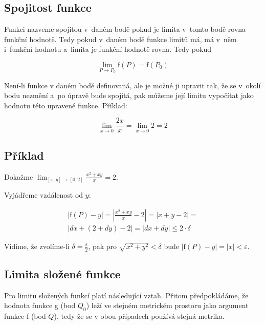 \subsection{Spojitost funkce}
\label{sec:spojitost_funkce}

Funkci nazveme spojitou v~daném bodě pokud je limita v~tomto bodě rovna funkční hodnotě. Tedy pokud v~daném bodě funkce limitů má, má v~něm i~funkční hodnotu a~limita je funkční hodnotě rovna. Tedy pokud

\begin{equation}
\lim_{P \to P_0} \mathrm{f}(P) = \mathrm{f}(P_0)
\end{equation}

Není-li funkce v daném bodě definovaná, ale je možné ji upravit tak, že se v~okolí bodu nezmění a~po úpravě bude spojitá, pak můžeme její limitu vypočítat jako hodnotu této upravené funkce. Příklad:

\begin{equation}
\lim_{x \to 0} \frac{2x}{x} = \lim_{x \to 0} 2 = 2
\end{equation}

\subsection{Příklad}

Dokažme \(\lim_{[x, y] \to [0, 2]} \frac{x^2 + x y}{x} = 2\).

Vyjádřeme vzdálenost od \(y\):

\begin{equation}
\begin{split}
|\mathrm{f}(P) - y| = \left|\frac{x^2 + x y}{x} - 2 \right| = \left|x + y - 2 \right| = \\
\left|dx + ( 2+ dy) - 2 \right| = \left|dx + dy\right| \leq 2 \cdot \delta
\end{split}
\end{equation}

Vidíme, že zvolíme-li \(\delta = \frac{\varepsilon}{2}\), pak pro \(\sqrt{x^2 + y^2} < \delta\) bude \(|\mathrm{f}(P) - y| = |x| < \varepsilon\).

\subsection{Limita složené funkce}

Pro limitu složených funkcí platí následující vztah. Přitom předpokládáme, že hodnota funkce g (bod \(Q_0\)) leží ve stejném metrickém prostoru jako argument funkce f (bod \(Q\)), tedy že se v obou případech používá stejná metrika.

